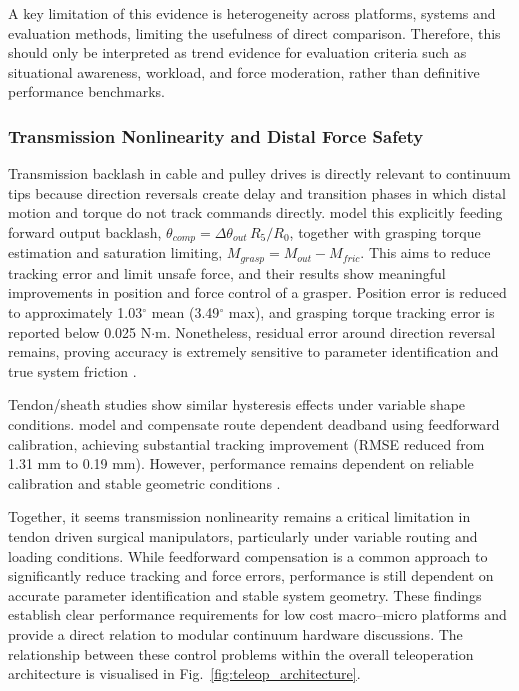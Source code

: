 \documentclass[12pt]{article}
\begin{document}
A key limitation of this evidence is heterogeneity across platforms, systems and
evaluation methods, limiting the usefulness of direct comparison. Therefore, this should only be interpreted
 as trend evidence for evaluation criteria such as situational
awareness, workload, and force moderation, rather than definitive performance
benchmarks.

\subsubsection{Transmission Nonlinearity and Distal Force Safety}
Transmission backlash in cable and pulley drives is directly relevant to continuum tips because direction reversals
create delay and transition phases in which distal motion and torque do not
track commands directly. \textcite{zou2022transmission} model this
explicitly feeding forward output
backlash, $\theta_{comp}=\Delta\theta_{out}\,R_5/R_0$, together with grasping
torque estimation and saturation limiting, $M_{grasp}=M_{out}-M_{fric}$. This aims to
reduce tracking error and limit unsafe force, and their results show
meaningful improvements in position and force control of a grasper. Position error is reduced to
approximately 1.03$^\circ$ mean (3.49$^\circ$ max), and grasping torque tracking
error is reported below 0.025 N$\cdot$m.
Nonetheless, residual error around direction reversal remains, proving accuracy is extremely 
sensitive to parameter identification and true system friction \parencite{zou2022transmission}.

Tendon/sheath studies show similar hysteresis effects under
variable shape conditions. \textcite{hong2025backlash} model and compensate
route dependent deadband using feedforward calibration, achieving substantial
tracking improvement (RMSE reduced from 1.31 mm to 0.19 mm). However,
performance remains dependent on reliable calibration and stable geometric
conditions \parencite{hong2025backlash}.

Together, it seems transmission nonlinearity remains a
critical limitation in tendon driven surgical manipulators, particularly under
variable routing and loading conditions. While feedforward compensation is a common approach to
significantly reduce tracking and force errors, performance is still dependent on
accurate parameter identification and stable system geometry.
These findings establish clear performance requirements for low cost macro--micro
platforms and provide a direct relation to modular continuum hardware
discussions. The relationship between these control problems within the overall
teleoperation architecture is visualised in Fig.~\ref{fig:teleop_architecture}.
\end{document}

